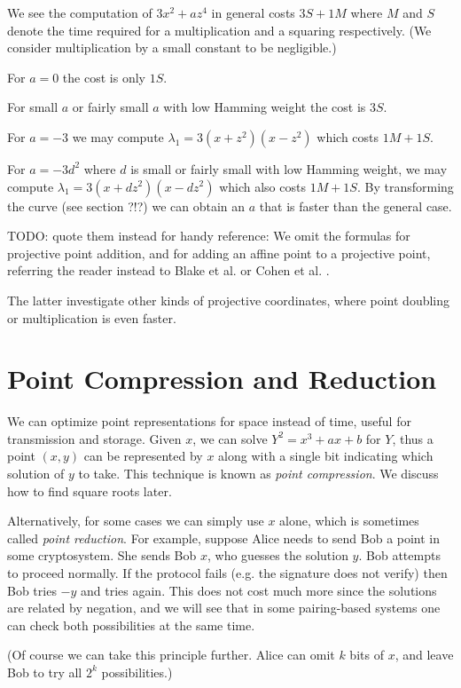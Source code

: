 We see the computation of $3x^2 + a z^4$ in general costs $3S + 1M$
where $M$ and $S$ denote the time required for a multiplication and
a squaring respectively. (We consider multiplication by
a small constant to be negligible.)

For $a=0$ the cost is only $1S$.

For small $a$ or fairly small $a$ with low Hamming weight the cost is $3S$.

For $a=-3$ we may compute $\lambda_1 = 3(x+z^2)(x-z^2)$ which costs
$1M + 1S$.

For $a = -3 d^2$ where $d$ is small or fairly small with low Hamming weight,
we may compute $\lambda_1 = 3(x+dz^2)(x-dz^2)$ which also costs $1M + 1S$.
By transforming the curve (see section ?!?)
we can obtain an $a$ that is faster than the general case.

TODO: quote them instead for handy reference:
We omit the formulas for projective point addition, and for adding
an affine point to a projective point, referring the reader instead
to Blake et al. or Cohen et al. \cite{stuff}.

The latter investigate other kinds of projective coordinates, where point
doubling or multiplication is even faster.

\section {Point Compression and Reduction}

We can optimize point representations for space instead of time,
useful for transmission and storage.
Given $x$, we can solve $Y^2 = x^3 + ax + b$ for $Y$, thus
a point $(x,y)$ can be represented by $x$ along with a single bit indicating
which solution of $y$ to take. This technique is known as \emph{point
compression}.
We discuss how to find square roots later.

Alternatively, for some cases we can simply use $x$ alone, which
is sometimes called \emph{point reduction}. For example,
suppose Alice needs to send Bob a point in some cryptosystem. She sends
Bob $x$, who guesses the solution $y$. Bob attempts to proceed normally.
If the protocol fails (e.g. the signature does not verify) then Bob tries
$-y$ and tries again. This does not cost much more since the solutions are
related by negation, and we will see that in some pairing-based systems
one can check both possibilities at the same time.

(Of course we can take this principle further. Alice can
omit $k$ bits of $x$, and leave Bob to try all $2^k$ possibilities.)


